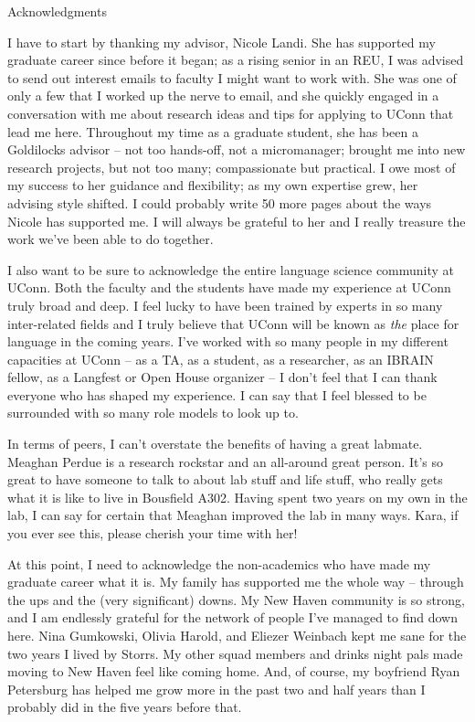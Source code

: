 \documentclass[../dissertation.tex]{subfiles}
\begin{document}
\begin{center} Acknowledgments
\end{center}
	I have to start by thanking my advisor, Nicole Landi. She has supported my graduate career since before it began; as a rising senior in an REU, I was advised to send out interest emails to faculty I might want to work with. She was one of only a few that I worked up the nerve to email, and she quickly engaged in a conversation with me about research ideas and tips for applying to UConn that lead me here. Throughout my time as a graduate student, she has been a Goldilocks advisor -- not too hands-off, not a micromanager; brought me into new research projects, but not too many; compassionate but practical. I owe most of my success to her guidance and flexibility; as my own expertise grew, her advising style shifted. I could probably write 50 more pages about the ways Nicole has supported me. I will always be grateful to her and I really treasure the work we've been able to do together. \par 
	I also want to be sure to acknowledge the entire language science community at UConn. Both the faculty and the students have made my experience at UConn truly broad and deep. I feel lucky to have been trained by experts in so many inter-related fields and I truly believe that UConn will be known as \textit{the} place for language in the coming years. I've worked with so many people in my different capacities at UConn -- as a TA, as a student, as a researcher, as an IBRAIN fellow, as a Langfest or Open House organizer -- I don't feel that I can thank everyone who has shaped my experience. I can say that I feel blessed to be surrounded with so many role models to look up to. \par 
	In terms of peers, I can't overstate the benefits of having a great labmate. Meaghan Perdue is a research rockstar and an all-around great person. It's so great to have someone to talk to about lab stuff and life stuff, who really gets what it is like to live in Bousfield A302. Having spent two years on my own in the lab, I can say for certain that Meaghan improved the lab in many ways. Kara, if you ever see this, please cherish your time with her! \par 
	At this point, I need to acknowledge the non-academics who have made my graduate career what it is. My family has supported me the whole way -- through the ups and the (very significant) downs. My New Haven community is so strong, and I am endlessly grateful for the network of people I've managed to find down here. Nina Gumkowski, Olivia Harold, and Eliezer Weinbach kept me sane for the two years I lived by Storrs. My other squad members and drinks night pals made moving to New Haven feel like coming home. And, of course, my boyfriend Ryan Petersburg has helped me grow more in the past two and half years than I probably did in the five years before that. \par 
\end{document}
